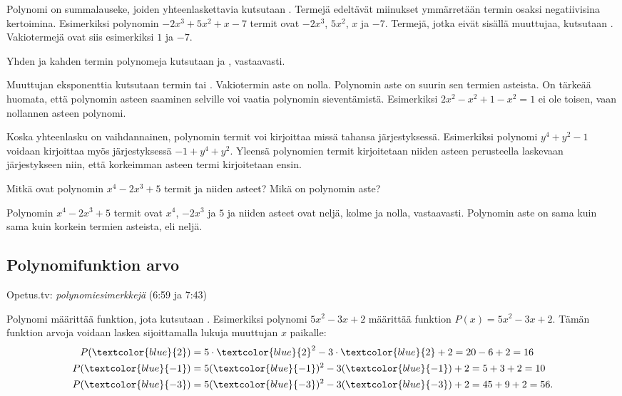 Polynomi on summalauseke, joiden yhteenlaskettavia kutsutaan .
Termejä edeltävät miinukset ymmärretään termin osaksi negatiivisina kertoimina.
Esimerkiksi polynomin $-2x^3+5x^2+x-7$ termit ovat $-2x^3$, $5x^2$, $x$ ja $-7$.
Termejä, jotka eivät sisällä muuttujaa, kutsutaan  .
Vakiotermejä ovat siis esimerkiksi $1$ ja $-7$.

Yhden ja kahden termin polynomeja kutsutaan  ja , vastaavasti.

Muuttujan eksponenttia kutsutaan termin  tai .
Vakiotermin aste on nolla. Polynomin aste on suurin sen termien asteista.
On tärkeää huomata, että polynomin asteen saaminen selville voi vaatia polynomin sieventämistä.
Esimerkiksi $2x^2-x^2+1-x^2 = 1$ ei ole toisen, vaan nollannen asteen polynomi.

Koska yhteenlasku on vaihdannainen, polynomin termit voi kirjoittaa missä tahansa järjestyksessä.
Esimerkiksi polynomi $y^4+y^2-1$ voidaan kirjoittaa myös järjestyksessä $-1+y^4+y^2$.
Yleensä polynomien termit kirjoitetaan niiden asteen perusteella laskevaan järjestykseen niin, että korkeimman asteen termi kirjoitetaan ensin.

\begin{esimerkki}
    Mitkä ovat polynomin $x^4-2x^3+5$ termit ja niiden asteet? Mikä on polynomin aste?
    \begin{esimvast}
        Polynomin $x^4-2x^3+5$ termit ovat $x^4$, $-2x^3$ ja $5$ ja niiden asteet ovat
        neljä, kolme ja nolla, vastaavasti. Polynomin aste on sama kuin sama kuin
        korkein termien asteista, eli neljä.
    \end{esimvast}
\end{esimerkki}

\subsection*{Polynomifunktion arvo}

{Opetus.tv: \emph{polynomiesimerkkejä} (6:59 ja 7:43)}

Polynomi määrittää funktion, jota kutsutaan .
Esimerkiksi polynomi $5x^2-3x+2$ määrittää funktion $P(x)=5x^2-3x+2$.
Tämän funktion arvoja voidaan laskea sijoittamalla lukuja muuttujan $x$ paikalle:
\begin{align*}
    P(\textcolor{blue}{2}) & = 5\cdot \textcolor{blue}{2}^2-3\cdot \textcolor{blue}{2}+2 = 20 - 6 + 2 = 16 \\
    P(\textcolor{blue}{-1}) & = 5(\textcolor{blue}{-1})^2-3(\textcolor{blue}{-1})+2 = 5 + 3 + 2 = 10 \\
    P(\textcolor{blue}{-3}) & = 5(\textcolor{blue}{-3})^2-3(\textcolor{blue}{-3})+2 = 45 + 9 + 2 = 56.
\end{align*}

